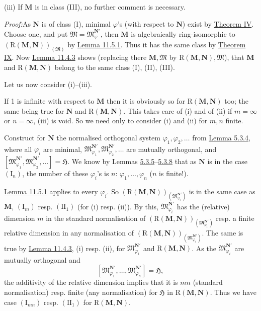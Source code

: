 \documentclass[12pt,b5paper,twoside]{article}
\newcommand{\Hspace}{\mathfrak H}
\newcommand{\M}{\mathbf M}
\newcommand{\N}{\mathbf N}
\newcommand{\Proof}{\par\noindent\textit{Proof:}\enspace}
\newcommand{\lemref}[1]{\hyperref[lem:#1]{Lemma #1}}
\newcommand{\thmref}[1]{\hyperref[thm:#1]{Theorem #1}}
\begin{document}
(iii) If $\M$ is in class (III), no further comment is necessary.

\Proof As $\N$ is of class (I), minimal $\varphi$'s (with respect to
$\N$) exist by \thmref{IV}. Choose one, and put
$\mathfrak M=\mathfrak M_{\varphi}^{\N'}$, then $\M$ is algebraically
ring-isomorphic to
$(\mathrm R(\M,\N))_{(\mathfrak M)}$ by \lemref{11.5.1}. Thus it has the
same class by \thmref{IX}. Now \lemref{11.4.3} shows (replacing there
$\M,\mathfrak M$ by $\mathrm R(\M,\N),\mathfrak M$), that $\M$ and
$\mathrm R(\M,\N)$ belong to the same class (I), (II), (III).

Let us now consider (i)--(iii).

If 1 is infinite with respect to $\M$ then it is obviously so for
$\mathrm R(\M,\N)$ too; the same being true for $\N$ and
$\mathrm R(\M,\N)$. This takes care of (i) and of (ii) if $m=\infty$ or
$n=\infty$, (iii) is void. So we need only to consider (i) and (ii) for
$m,n$ finite.

Construct for $\N$ the normalised orthogonal system
$\varphi_1,\varphi_2,\ldots$ from \lemref{5.3.4}, where all $\varphi_i$ are
minimal, $\mathfrak M_{\varphi_1}^{\N'},
\mathfrak M_{\varphi_2}^{\N'},\ldots$ are mutually orthogonal, and
$[\mathfrak M_{\varphi_1}^{\N'},
\mathfrak M_{\varphi_2}^{\N'},\ldots]=\Hspace$. We know by Lemmas
\hyperref[lem:5.3.5]{5.3.5}--\hyperref[lem:5.3.8]{5.3.8} that as $\N$ is in the case
$(\mathrm I_n)$, the number of these $\varphi_i$'s is $n$:
$\varphi_1,\ldots,\varphi_n$ ($n$ is finite!).

\lemref{11.5.1} applies to every $\varphi_i$. So
$(\mathrm R(\M,\N))_{(\mathfrak M_{\varphi_i}^{\N'})}$ is in the same case
as \(\M\), \((\mathrm I_m)\) resp. \((\mathrm{II}_1)\) (for (i) resp.
(ii)). By this, \(\mathfrak M_{\varphi_i}^{\N'}\) has the (relative)
dimension \(m\) in the standard normalisation of
\((\mathrm R(\M,\N))_{(\mathfrak M_{\varphi_i}^{\N'})}\) resp. a finite
relative dimension in any normalisation of
\((\mathrm R(\M,\N))_{(\mathfrak M_{\varphi_i}^{\N'})}\). The same is
true by \lemref{11.4.3}, (i) resp. (ii), for
\(\mathfrak M_{\varphi_i}^{\N'}\) and \(\mathrm R(\M,\N)\). As the
\(\mathfrak M_{\varphi_i}^{\N'}\) are mutually orthogonal and
\[
 [\mathfrak M_{\varphi_1}^{\N'},\ldots,
   \mathfrak M_{\varphi_n}^{\N'}]=\Hspace,
\]
the additivity of the relative dimension implies that it is \(mn\)
(standard normalisation) resp. finite (any normalisation) for \(\Hspace\) in
\(\mathrm R(\M,\N)\). Thus we have case \((\mathrm I_{mn})\) resp.
\((\mathrm{II}_1)\) for \(\mathrm R(\M,\N)\).
\end{document}
